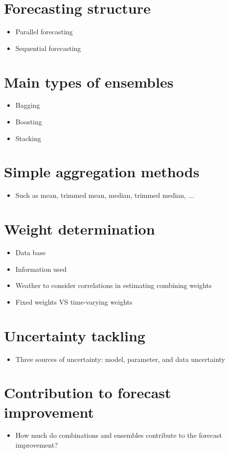 \documentclass[11pt]{article}
\begin{document}
\section{Forecasting structure}
\begin{itemize}
\item Parallel forecasting
\item Sequential forecasting
\end{itemize}


\section{Main types of ensembles}
\begin{itemize}
\item Bagging
\item Boosting
\item Stacking
\end{itemize}


\section{Simple aggregation methods}
\begin{itemize}
\item Such as mean, trimmed mean, median, trimmed median, ...
\end{itemize}


\section{Weight determination}
\begin{itemize}
\item Data base
\item Information used
\item Weather to consider correlations in estimating combining weights
\item Fixed weights VS time-varying weights
\end{itemize}


\section{Uncertainty tackling}
\begin{itemize}
\item Three sources of uncertainty: model, parameter, and data uncertainty
\end{itemize}


\section{Contribution to forecast improvement}
\begin{itemize}
\item How much do combinations and ensembles contribute to the forecast improvement?
\end{itemize}
\end{document}

